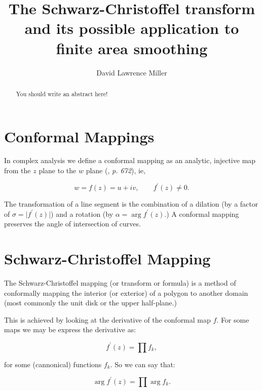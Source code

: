 \documentclass[a4paper,10pt]{amsart}
\title{The Schwarz-Christoffel transform and its possible application to finite area smoothing}
\author{David Lawrence Miller}
\newcommand{\sch}{Schwarz-Christoffel }
\newcommand{\fprime}{f^\prime(z)}
\begin{document}
 
\begin{abstract}
You should write an abstract here!

\end{abstract}
 
 
\newtheorem{thm}{Theorem}[section]
 
\newtheorem{defn}{Definition}[section]
 
\maketitle
 
\section{Conformal Mappings}

In complex analysis we define a conformal mapping as an analytic, injective map from the $z$ plane to the $w$ plane (\cite{handbuch}, \emph{p. 672}), ie,

\begin{equation*}
w=f(z)=u+iv, \qquad f^\prime(z) \neq 0.
\end{equation*} 

The transformation of a line segment is the combination of a dilation (by a factor of $\sigma=\vert f^\prime(z) \vert$) and a rotation (by $\alpha = \arg f^\prime(z)$.) A conformal mapping preserves the angle of intersection of curves.

\section{\sch Mapping}

The \sch mapping (or transform or formula) is a method of conformally mapping the interior (or exterior) of a polygon to another domain (most commonly the unit disk or the upper half-plane.)

This is achieved by looking at the derivative of the conformal map $f$. For some maps we may be express the derivative as:

\begin{equation}
\fprime = \prod f_k,
\end{equation}

for some (cannonical) functions $f_k$. So we can say that:

\begin{equation}
\arg \fprime = \prod \arg f_k.
\end{equation}
\end{document}
